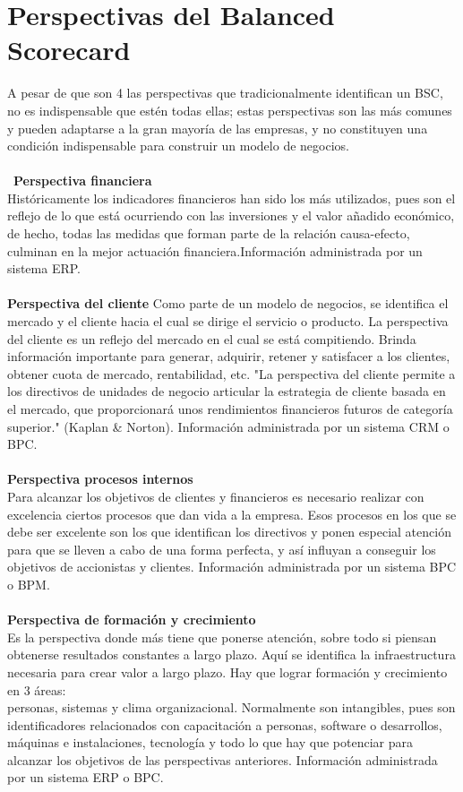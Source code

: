 \section{Perspectivas del Balanced Scorecard}
\item{A pesar de que son 4 las perspectivas que tradicionalmente identifican un BSC, no es indispensable que estén todas ellas; estas perspectivas son las más comunes y pueden adaptarse a la gran mayoría de las empresas, y no constituyen una condición indispensable para construir un modelo de negocios.\\\\\
\textbf{Perspectiva financiera}\\
Históricamente los indicadores financieros han sido los más utilizados, pues son el reflejo de lo que está ocurriendo con las inversiones y el valor añadido económico, de hecho, todas las medidas que forman parte de la relación causa-efecto, culminan en la mejor actuación financiera.Información administrada por un sistema ERP.\\\\
\textbf{Perspectiva del cliente}
Como parte de un modelo de negocios, se identifica el mercado y el cliente hacia el cual se dirige el servicio o producto. La perspectiva del cliente es un reflejo del mercado en el cual se está compitiendo. Brinda información importante para generar, adquirir, retener y satisfacer a los clientes, obtener cuota de mercado, rentabilidad, etc. "La perspectiva del cliente permite a los directivos de unidades de negocio articular la estrategia de cliente basada en el mercado, que proporcionará unos rendimientos financieros futuros de categoría superior." (Kaplan & Norton).
Información administrada por un sistema CRM o BPC.\\\\
\textbf{Perspectiva procesos internos}\\
Para alcanzar los objetivos de clientes y financieros es necesario realizar con excelencia ciertos procesos que dan vida a la empresa. Esos procesos en los que se debe ser excelente son los que identifican los directivos y ponen especial atención para que se lleven a cabo de una forma perfecta, y así influyan a conseguir los objetivos de accionistas y clientes.
Información administrada por un sistema BPC o BPM.\\\\
\textbf{Perspectiva de formación y crecimiento}\\
Es la perspectiva donde más tiene que ponerse atención, sobre todo si piensan obtenerse resultados constantes a largo plazo. Aquí se identifica la infraestructura necesaria para crear valor a largo plazo. Hay que lograr formación y crecimiento en 3 áreas:\\ personas, sistemas y clima organizacional. Normalmente son intangibles, pues son identificadores relacionados con capacitación a personas, software o desarrollos, máquinas e instalaciones, tecnología y todo lo que hay que potenciar para alcanzar los objetivos de las perspectivas anteriores.
Información administrada por un sistema ERP o BPC.}

